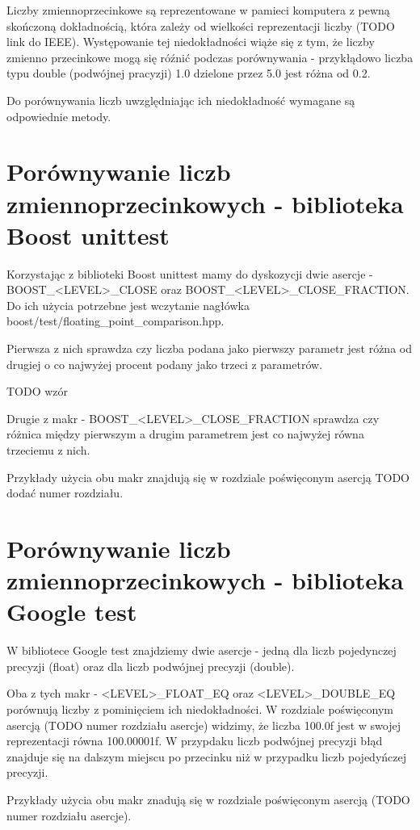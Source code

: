 \documentclass[12pt,a4paper,notitlepage]{report}
\begin{document}
Liczby zmiennoprzecinkowe są reprezentowane w pamieci komputera z pewną skończoną dokładnością, która zależy od wielkości reprezentacji liczby (TODO link do IEEE). Występowanie tej niedokładności wiąże się z tym, że liczby zmienno przecinkowe mogą się róźnić podczas porównywania - przykłądowo liczba typu double (podwójnej pracyzji) 1.0 dzielone przez 5.0 jest różna od 0.2.

Do porównywania liczb uwzględniając ich niedokładność wymagane są odpowiednie metody.

\section{Porównywanie liczb zmiennoprzecinkowych - biblioteka Boost unittest}

Korzystając z biblioteki Boost unittest mamy do dyskozycji dwie asercje - BOOST{\_}<LEVEL>{\_}CLOSE oraz BOOST{\_}<LEVEL>{\_}CLOSE{\_}FRACTION. Do ich użycia potrzebne jest wczytanie nagłówka boost/test/floating{\_}point{\_}comparison.hpp.

Pierwsza z nich sprawdza czy liczba podana jako pierwszy parametr jest różna od drugiej o co najwyżej procent podany jako trzeci z parametrów.

TODO wzór

Drugie z makr - BOOST{\_}<LEVEL>{\_}CLOSE{\_}FRACTION sprawdza czy różnica między pierwszym a drugim parametrem jest co najwyżej równa trzeciemu z nich.

Przykłady użycia obu makr znajdują się w rozdziale poświęconym asercją TODO dodać numer rozdziału.

\section{Porównywanie liczb zmiennoprzecinkowych - biblioteka Google test}

W bibliotece Google test znajdziemy dwie asercje - jedną dla liczb pojedynczej precyzji (float) oraz dla liczb podwójnej precyzji (double).

Oba z tych makr - <LEVEL>{\_}FLOAT{\_}EQ oraz <LEVEL>{\_}DOUBLE{\_}EQ porównują liczby z pominięciem ich niedokładności. W rozdziale poświęconym asercją (TODO numer rozdziału asercje) widzimy, że liczba 100.0f jest w swojej reprezentacji równa 100.00001f. W przypdaku liczb podwójnej precyzji błąd znajduje się na dalszym miejscu po przecinku niż w przypadku liczb pojedyńczej precyzji.

Przykłady użycia obu makr znadują się w rozdziale poświęconym asercją (TODO numer rozdziału asercje).
\end{document}
